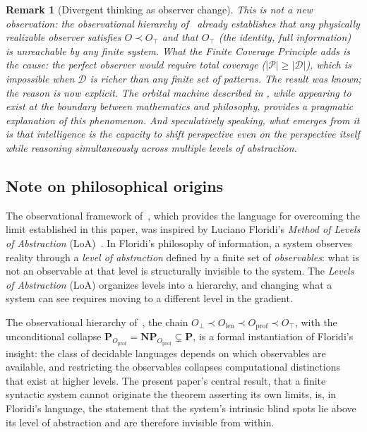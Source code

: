 \documentclass[11pt]{article}
\newtheorem{remark}[theorem]{Remark}
\begin{document}
\begin{remark}[Divergent thinking as observer change]
This is not a new observation: the observational hierarchy
of~\cite{buono2026framework} already establishes that any physically
realizable observer satisfies $O \prec O_\top$ and that $O_\top$ (the
identity, full information) is unreachable by any finite system. What
the Finite Coverage Principle adds is the \emph{cause}: the perfect
observer would require total coverage ($|\mathcal{P}| \geq
|\mathcal{D}|$), which is impossible when $\mathcal{D}$ is richer than
any finite set of patterns. The result was known; the reason is now
explicit. The orbital machine described in \cite{buono2026syntaxseedynamicsyntactic}, 
while appearing to exist at the boundary between mathematics and philosophy, 
provides a pragmatic explanation of this phenomenon. And speculatively 
speaking, what emerges from it is that intelligence is the capacity to 
shift perspective even on the perspective itself while reasoning simultaneously 
across multiple levels of abstraction.
\end{remark}

\subsection{Note on philosophical origins}

The observational framework
of~\cite{buono2026framework,buono2026observer, buono2026obstruction, buono2026syntaxseedynamicsyntactic}, which provides the language
for overcoming the limit established in this paper, was inspired by
Luciano Floridi's \emph{Method of Levels of Abstraction}
(LoA)~\cite{floridi2008,floridi2011}. In Floridi's philosophy of
information, a system observes reality through a \emph{level of
abstraction} defined by a finite set of \emph{observables}: what is not
an observable at that level is structurally invisible to the system. The
\emph{Levels of Abstraction} (LoA) organizes levels into a hierarchy,
and changing what a system can see requires moving to a different level
in the gradient.

\smallskip

The observational hierarchy of~\cite{buono2026framework}, the chain
$O_\bot \prec O_{\mathrm{len}} \prec O_{\mathrm{prof}} \prec O_\top$,
with the unconditional collapse
$\mathbf{P}_{O_{\mathrm{prof}}} = \mathbf{NP}_{O_{\mathrm{prof}}}
\subsetneq \mathbf{P}$, is a formal instantiation of Floridi's
insight: the class of decidable languages depends on which observables
are available, and restricting the observables collapses computational
distinctions that exist at higher levels. The present paper's central
result, that a finite syntactic system cannot originate the theorem
asserting its own limits, is, in Floridi's language, the statement
that the system's intrinsic blind spots lie above its level of
abstraction and are therefore invisible from within.
\end{document}
